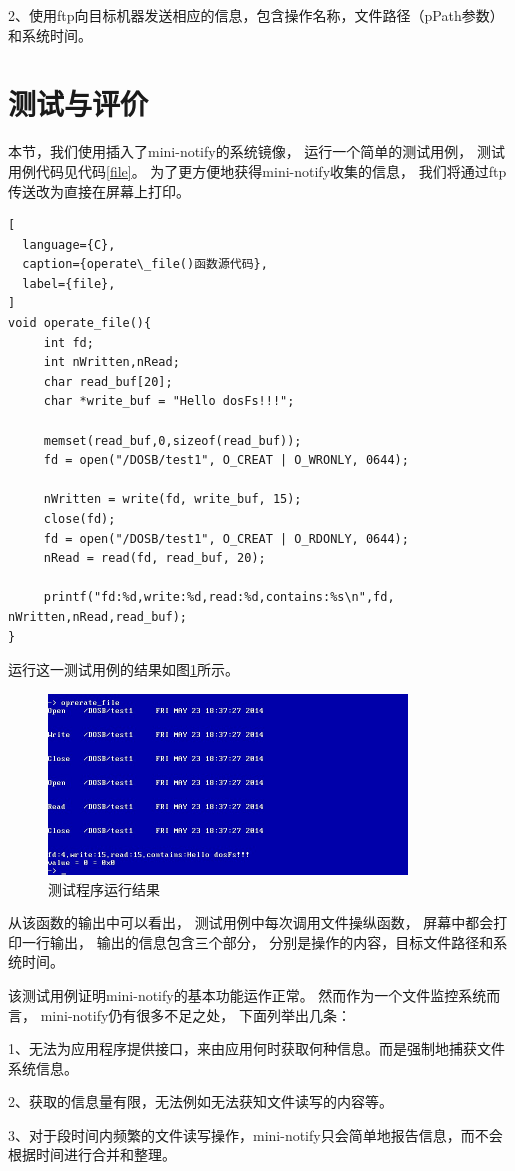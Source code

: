 2、使用ftp向目标机器发送相应的信息，包含操作名称，文件路径（pPath参数）和系统时间。


\section{测试与评价}

本节，我们使用插入了mini-notify的系统镜像，
运行一个简单的测试用例，
测试用例代码见代码\ref{file}。
为了更方便地获得mini-notify收集的信息，
我们将通过ftp传送改为直接在屏幕上打印。

\begin{lstlisting}[
  language={C},
  caption={operate\_file()函数源代码},
  label={file},
]
void operate_file(){
     int fd; 
     int nWritten,nRead;
     char read_buf[20]; 
     char *write_buf = "Hello dosFs!!!";

     memset(read_buf,0,sizeof(read_buf));
     fd = open("/DOSB/test1", O_CREAT | O_WRONLY, 0644);

     nWritten = write(fd, write_buf, 15);
     close(fd);
     fd = open("/DOSB/test1", O_CREAT | O_RDONLY, 0644);
     nRead = read(fd, read_buf, 20);

     printf("fd:%d,write:%d,read:%d,contains:%s\n",fd, nWritten,nRead,read_buf);
}
\end{lstlisting}


运行这一测试用例的结果如图\ref{after}所示。

\begin{figure}[h!]
    \centering
    \includegraphics[width=0.85\textwidth]{figure/after.jpg}
    \caption{测试程序运行结果}
    \label{after}
\end{figure}

从该函数的输出中可以看出，
测试用例中每次调用文件操纵函数，
屏幕中都会打印一行输出，
输出的信息包含三个部分，
分别是操作的内容，目标文件路径和系统时间。

该测试用例证明mini-notify的基本功能运作正常。
然而作为一个文件监控系统而言，
mini-notify仍有很多不足之处，
下面列举出几条：

1、无法为应用程序提供接口，来由应用何时获取何种信息。而是强制地捕获文件系统信息。

2、获取的信息量有限，无法例如无法获知文件读写的内容等。

3、对于段时间内频繁的文件读写操作，mini-notify只会简单地报告信息，而不会根据时间进行合并和整理。

















